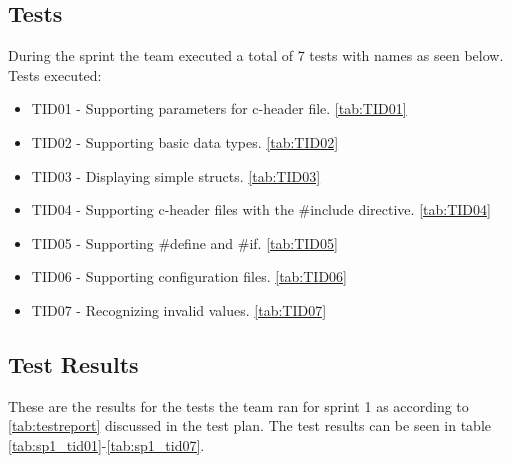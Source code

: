 \subsection{Tests}
During the sprint the team executed a total of 7 tests with names as seen
below. Tests executed:
\begin{itemize}
	\item TID01 - Supporting parameters for c-header file. \autoref{tab:TID01}
	\item TID02 - Supporting basic data types. \autoref{tab:TID02}
	\item TID03 - Displaying simple structs. \autoref{tab:TID03}
	\item TID04 - Supporting c-header files with the \#include directive. \autoref{tab:TID04}
	\item TID05 - Supporting \#define and \#if. \autoref{tab:TID05}
	\item TID06 - Supporting configuration files. \autoref{tab:TID06}
	\item TID07 - Recognizing invalid values. \autoref{tab:TID07}
\end{itemize}

\subsection{Test Results}
These are the results for the tests the team ran for sprint 1 as according to \autoref{tab:testreport} discussed in the test plan.
The test results can be seen in table \ref{tab:sp1_tid01}-\ref{tab:sp1_tid07}.
\begin{table}[!htb] \footnotesize \center
\caption{Supporting parameters for c-header file \label{tab:sp1_tid01}}
\noindent{}
\end{table}

